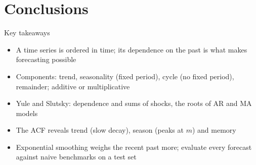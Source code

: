 \section{Conclusions}

\begin{frame}{Key takeaways}
\itemsize{\small}
\begin{itemize}
    \item A time series is ordered in time; its dependence on the past is what makes forecasting possible
    \item Components: trend, seasonality (fixed period), cycle (no fixed period), remainder; additive or multiplicative
    \item Yule and Slutsky: dependence and sums of shocks, the roots of AR and MA models
    \item The ACF reveals trend (slow decay), season (peaks at $m$) and memory
    \item Exponential smoothing weighs the recent past more; evaluate every forecast against naive benchmarks on a test set
\end{itemize}
\end{frame}

